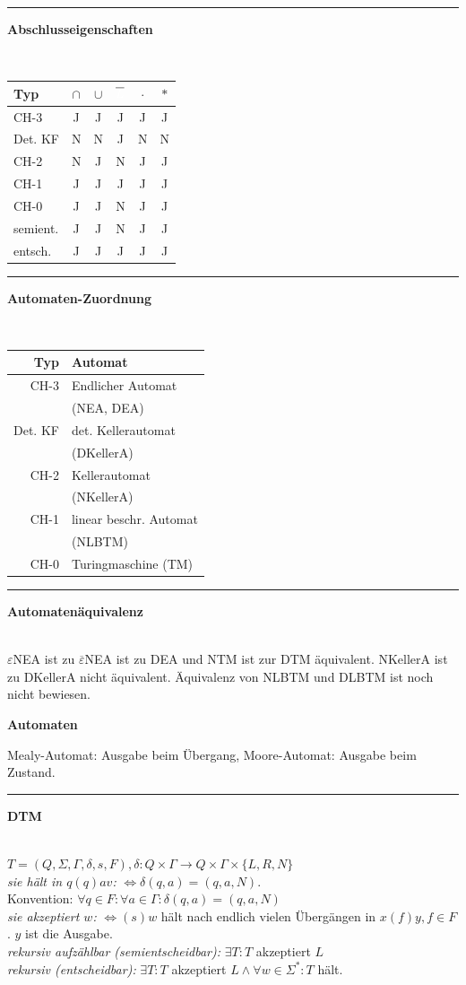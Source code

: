 \documentclass{article}
\newcommand{\h}[1]{\vspace{1ex}\begin{center}\small\textbf{#1}\end{center}}
\newcommand{\hh}[1]{{\vspace{1pt}\hrule\vspace{1pt} \noindent\textbf{#1}}\\}
\newcommand{\hhh}[1]{{\vspace{1pt}\noindent\emph{#1:}}}
\newcommand{\FM}[1]{{\color{red}\emph{#1}}}
\begin{document}
\begin{multicols}{4}
\hh{Abschlusseigenschaften}
\begin{tabular}{l|c|c|c|c|c}
Typ & $\cap$ & $\cup$ & $\overline{\color{white}L}$ & $\cdot$ & $*$\\
\hline
CH-3 & J & J & J & J & J \\
Det. KF & N & N & J & N & N \\
CH-2& N & J & N & J & J \\
CH-1& J & J & J & J & J \\
CH-0& J & J & N & J & J \\
semient. & J & J & N & J & J \\
entsch.  & J & J & J & J & J
\end{tabular}

\hh{Automaten-Zuordnung}


\begin{tabular}{r|l}
Typ  & Automat \\
\hline
CH-3 & Endlicher Automat \\
     & (NEA, DEA) \\
Det. KF & det. Kellerautomat\\
        & (DKellerA) \\
CH-2 & Kellerautomat \\ 
     & (NKellerA) \\
CH-1 & linear beschr. Automat\\
     & (NLBTM) \\ %
CH-0 & Turingmaschine (TM) 
\end{tabular}

\hh{Automatenäquivalenz}
$\varepsilon$NEA ist zu $\overline\varepsilon$NEA ist zu DEA und NTM ist zur DTM äquivalent. NKellerA ist zu DKellerA nicht äquivalent. Äquivalenz von NLBTM und DLBTM ist noch nicht bewiesen.

\h{Automaten}

Mealy-Automat: Ausgabe beim Übergang, Moore-Automat: Ausgabe beim Zustand.
\hh{DTM}
$T=(Q, \Sigma, \Gamma, \delta, s, F ), \delta: Q\times\Gamma\to Q\times\Gamma\times\{L, R, N\}$\\
\hhh{sie hält in $q(q)av$} $\Leftrightarrow\delta(q, a)=(q,a,N).$\\
Konvention: $\forall q\in F:\forall a\in\Gamma:\delta(q, a) = (q, a, N)$\\
\hhh{sie akzeptiert $w$} $\Leftrightarrow (s)w$ hält nach endlich vielen Übergängen in $x(f)y, f\in F$. $y$ ist die Ausgabe.\\
\hhh{rekursiv aufzählbar (semientscheidbar)} $\exists T:T$ akzeptiert $L$\\
\hhh{rekursiv (entscheidbar)} $\exists T: T$ akzeptiert $L\wedge\forall w\in\Sigma^*:T$ hält.\\


\end{multicols}
\end{document}
